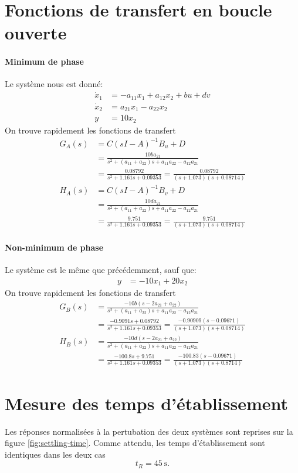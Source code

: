 \documentclass[frenchb, paper=a4, fontsize=11pt]{scrartcl}
\numberwithin{equation}{section}					%
\numberwithin{figure}{section}					%
\numberwithin{table}{section}						%
\begin{document}
\section{Fonctions de transfert en boucle ouverte}
\paragraph{Minimum de phase}
Le système nous est donné:
\begin{align*}
\dot{x}_1 &= -a_{11}x_1 + a_{12}x_2 + bu + dv\\
\dot{x}_2 &= a_{21}x_1 - a_{22} x_2\\
y&= 10x_2
\end{align*}
On trouve rapidement les fonctions de transfert
\begin{align*}
G_A(s) &= C(sI-A)^{-1} B_u + D\\
&=\frac{10ba_{21}}{s^2 + (a_{11}+a_{22})s + a_{11}a_{22} - a_{12}a_{21}}\\
&=\frac{0.08792}{s^2+1.161s+0.09353}
= \frac{0.08792}{(s+1.073)(s+0.08714)}\\
H_A(s) &= C(sI-A)^{-1} B_v + D\\
&=\frac{10da_{21}}{s^2 + (a_{11}+a_{22})s + a_{11}a_{22} - a_{12}a_{21}}\\
&=\frac{9.751}{s^2+1.161s+0.09353}
= \frac{9.751}{(s+1.073)(s+0.08714)}
\end{align*}

\paragraph{Non-minimum de phase}

Le système est le même que précédemment, sauf que:
\begin{align*}
y&= -10x_1 + 20x_2
\end{align*}
On trouve rapidement les fonctions de transfert
\begin{align*}
G_B(s) &= \frac{-10 b (s-2a_{21}+a_{22})}{s^2 + (a_{11}+a_{22})s + a_{11}a_{22}-a_{12}a_{21}}\\
&=\frac{-0.9091s+0.08792}{s^2+1.161s+0.09353} = \frac{-0.90909(s-0.09671)}{(s+1.073)(s+0.08714)}\\
H_B(s) &= \frac{-10 d (s-2a_{21}+a_{22})}{s^2 + (a_{11}+a_{22})s + a_{11}a_{22}-a_{12}a_{21}}\\
&=\frac{-100.8s+9.751}{s^2+1.161s+0.09353}
=\frac{-100.83(s-0.09671)}{(s+1.073)(s+0.8714)}
\end{align*}

\section{Mesure des temps d'établissement}
Les réponses normalisées à la pertubation des deux systèmes sont
reprises sur la figure \ref{fig:settling-time}. Comme attendu,
les temps d'établissement sont identiques dans les deux cas
\begin{equation}
	t_R = \SI{45}{\second}.
\end{equation}
\end{document}
